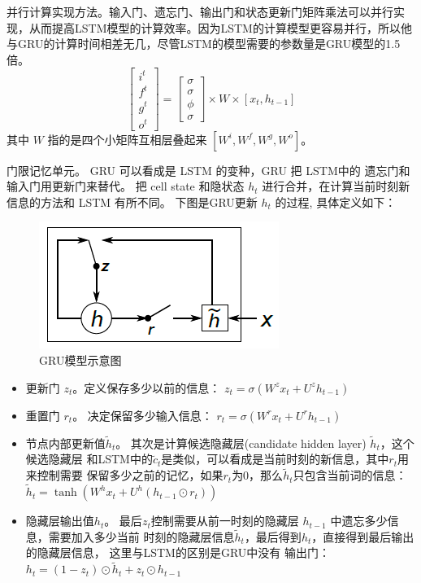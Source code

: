 {并行计算实现方法}。输入门、遗忘门、输出门和状态更新门矩阵乘法可以并行实现，从而提高LSTM模型的计算效率。因为LSTM的计算模型更容易并行，所以他与GRU的计算时间相差无几，尽管LSTM的模型需要的参数量是GRU模型的1.5倍。
\begin{equation}\label{equ:lstm}
\begin{bmatrix} i^t\\ f^t\\g^t\\o^t \end{bmatrix} =\begin{bmatrix}\sigma\\ \sigma\\\phi\\\sigma\end{bmatrix}\times W\times[x_t,h_{t-1}]
\end{equation}
其中 $W$ 指的是四个小矩阵互相层叠起来 $[W^i,W^f,W^g,W^o]$。




{门限记忆单元。} GRU 可以看成是 LSTM 的变种，GRU 把 LSTM中的 遗忘门和输入门用更新门来替代。 把 cell state 和隐状态 $h_t$ 进行合并，在计算当前时刻新信息的方法和 LSTM 有所不同。 下图是GRU更新 $h_t$ 的过程, 具体定义如下：
\begin{figure}[!h]
  \centering
  \includegraphics[width=0.45\linewidth]{./figures/gru.png}
  \caption{GRU模型示意图}\label{fig:gru}
\end{figure}

\begin{itemize}
\item 更新门 $z_t$。定义保存多少以前的信息： $z_t = \sigma ( W^z x_t+ U^z h_{t-1}  )$

\item 重置门 $r_t$。 决定保留多少输入信息： $r_t = \sigma(W^r x_t  + U^r h_{t-1}  )$

\item 节点内部更新值$\tilde h_t $。 其次是计算候选隐藏层(candidate hidden layer) $\tilde h_t$，这个候选隐藏层 和LSTM中的$\tilde c_t$是类似，可以看成是当前时刻的新信息，其中$r_t$用来控制需要 保留多少之前的记忆，如果$r_t$为0，那么$\tilde h_t$只包含当前词的信息：$\tilde h_t  = \tanh (W^h x_t  + U^h(h_{t-1} \odot r_t) )$

\item 隐藏层输出值$h_t$。 最后$z_t$控制需要从前一时刻的隐藏层 $h_{t-1}$ 中遗忘多少信息，需要加入多少当前 时刻的隐藏层信息$\tilde h_t$，最后得到$h_t$，直接得到最后输出的隐藏层信息， 这里与LSTM的区别是GRU中没有 输出门：$h_t = (1-z_t)\odot \tilde h_t  + z_t \odot h_{t-1}$
\end{itemize}

